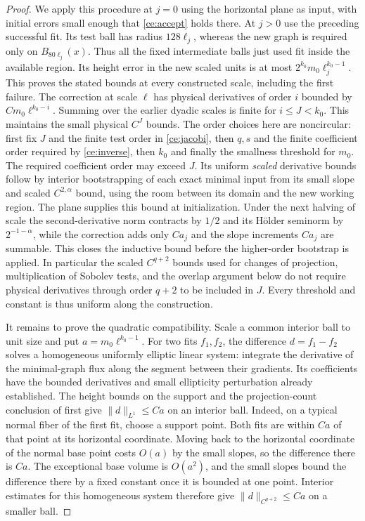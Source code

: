 \begin{proof}
We apply this procedure at $j=0$ using the horizontal plane as input,
with initial errors small enough that \eqref{ce:accept} holds there.
At $j>0$ use the preceding successful fit.  Its test ball has radius
$128\ell_j$, whereas the new graph is required only on
$B_{80\ell_j}(x)$.  Thus all the fixed intermediate balls just used
fit inside the available region.  Its height error in the new scaled
units is at most $2^{k_0}m_0\ell_j^{k_0-1}$.  This proves the stated
bounds at every constructed scale, including the first failure.  The
correction at scale $\ell$ has physical derivatives of order $i$
bounded by $Cm_0\ell^{k_0-i}$.  Summing over the earlier dyadic scales
is finite for $i\le J<k_0$.  This maintains the small physical
$C^J$ bounds.  The order choices here are noncircular: first fix $J$
and the finite test order in \eqref{ce:jacobi}, then $q,s$ and the
finite coefficient order required by \eqref{ce:inverse}, then $k_0$
and finally the smallness threshold for $m_0$.  The required
coefficient order may exceed $J$.  Its uniform \emph{scaled}
derivative bounds follow by interior bootstrapping of each exact
minimal input from its small slope and scaled $C^{2,\alpha}$ bound,
using the room between its domain and the new working region.
The plane supplies this bound at initialization.  Under the next
halving of scale the second-derivative norm contracts by $1/2$ and
its H\"older seminorm by $2^{-1-\alpha}$, while the correction adds
only $Ca_j$ and the slope increments $Ca_j$ are summable.  This
closes the inductive bound before the higher-order bootstrap is
applied.  In particular the scaled $C^{q+2}$ bounds used for changes
of projection, multiplication of Sobolev tests, and the overlap
argument below do not require physical derivatives through order
$q+2$ to be included in $J$.  Every threshold and constant is thus
uniform along the construction.

It remains to prove the quadratic compatibility.  Scale a common
interior ball to unit size and put $a=m_0\ell^{k_0-1}$.  For two fits
$f_1,f_2$, the difference $d=f_1-f_2$ solves a homogeneous uniformly
elliptic linear system: integrate the derivative of the minimal-graph
flux along the segment between their gradients.  Its coefficients
have the bounded derivatives and small ellipticity perturbation
already established.  The height bounds on the support and the
projection-count conclusion of  first give
$\|d\|_{L^1}\le Ca$ on an interior ball.  Indeed, on a typical normal fiber of the first fit, choose a support
point. Both fits are within $Ca$ of that point at its horizontal
coordinate. Moving back to the horizontal coordinate of the normal
base point costs $O(a)$ by the small slopes, so the difference there
is $Ca$. The exceptional base volume
is $O(a^2)$, and the small slopes bound the difference there by a fixed
constant once it is bounded at one point.  Interior estimates for this
homogeneous system therefore give $\|d\|_{C^{q+2}}\le Ca$ on a
smaller ball.


\end{proof}
